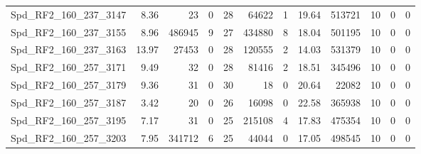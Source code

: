 \begin{longtable}[c]{@{}lrrrrrrrrrrr@{}}
Spd\_RF2\_160\_237\_3147      & 8.36                   & 23                      & 0                       & 28                     & 64622                   & 1                       & 19.64                   & 513721                   & 10                       & 0                        & 0                        \\
Spd\_RF2\_160\_237\_3155      & 8.96                   & 486945                  & 9                       & 27                     & 434880                  & 8                       & 18.04                   & 501195                   & 10                       & 0                        & 0                        \\
Spd\_RF2\_160\_237\_3163      & 13.97                  & 27453                   & 0                       & 28                     & 120555                  & 2                       & 14.03                   & 531379                   & 10                       & 0                        & 0                        \\
Spd\_RF2\_160\_257\_3171      & 9.49                   & 32                      & 0                       & 28                     & 81416                   & 2                       & 18.51                   & 345496                   & 10                       & 0                        & 0                        \\
Spd\_RF2\_160\_257\_3179      & 9.36                   & 31                      & 0                       & 30                     & 18                      & 0                       & 20.64                   & 22082                    & 10                       & 0                        & 0                        \\
Spd\_RF2\_160\_257\_3187      & 3.42                   & 20                      & 0                       & 26                     & 16098                   & 0                       & 22.58                   & 365938                   & 10                       & 0                        & 0                        \\
Spd\_RF2\_160\_257\_3195      & 7.17                   & 31                      & 0                       & 25                     & 215108                  & 4                       & 17.83                   & 475354                   & 10                       & 0                        & 0                        \\
Spd\_RF2\_160\_257\_3203      & 7.95                   & 341712                  & 6                       & 25                     & 44044                   & 0                       & 17.05                   & 498545                   & 10                       & 0                        & 0                        \\

\end{longtable}
